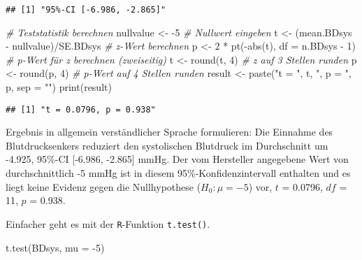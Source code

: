 \documentclass[
]{book}
\newenvironment{Shaded}{\begin{snugshade}}{\end{snugshade}}
\newcommand{\AttributeTok}[1]{\textcolor[rgb]{0.77,0.63,0.00}{#1}}
\newcommand{\CommentTok}[1]{\textcolor[rgb]{0.56,0.35,0.01}{\textit{#1}}}
\newcommand{\DecValTok}[1]{\textcolor[rgb]{0.00,0.00,0.81}{#1}}
\newcommand{\FunctionTok}[1]{\textcolor[rgb]{0.00,0.00,0.00}{#1}}
\newcommand{\NormalTok}[1]{#1}
\newcommand{\OtherTok}[1]{\textcolor[rgb]{0.56,0.35,0.01}{#1}}
\newcommand{\SpecialCharTok}[1]{\textcolor[rgb]{0.00,0.00,0.00}{#1}}
\newcommand{\StringTok}[1]{\textcolor[rgb]{0.31,0.60,0.02}{#1}}
\begin{document}
\begin{verbatim}
## [1] "95%-CI [-6.986, -2.865]"
\end{verbatim}

\begin{Shaded}
\begin{Highlighting}[]
\CommentTok{\# Teststatistik berechnen}
\NormalTok{nullvalue }\OtherTok{\textless{}{-}} \SpecialCharTok{{-}}\DecValTok{5}                        \CommentTok{\# Nullwert eingeben}
\NormalTok{t }\OtherTok{\textless{}{-}}\NormalTok{ (mean.BDsys }\SpecialCharTok{{-}}\NormalTok{ nullvalue)}\SpecialCharTok{/}\NormalTok{SE.BDsys }\CommentTok{\# z{-}Wert berechnen}
\NormalTok{p }\OtherTok{\textless{}{-}} \DecValTok{2} \SpecialCharTok{*} \FunctionTok{pt}\NormalTok{(}\SpecialCharTok{{-}}\FunctionTok{abs}\NormalTok{(t), }\AttributeTok{df =}\NormalTok{ n.BDsys }\SpecialCharTok{{-}} \DecValTok{1}\NormalTok{) }\CommentTok{\# p{-}Wert für z berechnen  (zweiseitig) }
\NormalTok{t }\OtherTok{\textless{}{-}} \FunctionTok{round}\NormalTok{(t, }\DecValTok{4}\NormalTok{)                       }\CommentTok{\# z auf 3 Stellen runden}
\NormalTok{p }\OtherTok{\textless{}{-}} \FunctionTok{round}\NormalTok{(p, }\DecValTok{4}\NormalTok{)                       }\CommentTok{\# p{-}Wert auf 4 Stellen runden}
\NormalTok{result }\OtherTok{\textless{}{-}} \FunctionTok{paste}\NormalTok{(}\StringTok{"t = "}\NormalTok{, t, }\StringTok{", p = "}\NormalTok{, p, }\AttributeTok{sep =} \StringTok{""}\NormalTok{)  }
\FunctionTok{print}\NormalTok{(result)}
\end{Highlighting}
\end{Shaded}

\begin{verbatim}
## [1] "t = 0.0796, p = 0.938"
\end{verbatim}

Ergebnis in allgemein verständlicher Sprache formulieren: Die Einnahme des Blutdrucksenkers reduziert den systolischen Blutdruck im Durchschnitt um -4.925, 95\%-CI {[}-6.986, -2.865{]} mmHg. Der vom Hersteller angegebene Wert von durchschnittlich -5 mmHg ist in diesem 95\%-Konfidenzintervall enthalten und es liegt keine Evidenz gegen die Nullhypothese (\(H_0: \mu = -5\)) vor, \(t\) = 0.0796, \(df\) = 11, \(p\) = 0.938.

Einfacher geht es mit der \texttt{R}-Funktion \texttt{t.test()}.

\begin{Shaded}
\begin{Highlighting}[]
\FunctionTok{t.test}\NormalTok{(BDsys, }\AttributeTok{mu =} \SpecialCharTok{{-}}\DecValTok{5}\NormalTok{)}
\end{Highlighting}
\end{Shaded}
\end{document}
